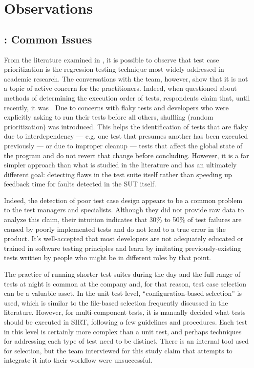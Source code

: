 \section{Observations}
\label{sec:ind_observations}

\subsection{: Common Issues}
\label{sec:ind_rq1}

From the literature examined in , it is possible to observe that test case prioritization is the regression testing technique most widely addressed in academic research.
The conversations with the team, however, show that it is not a topic of active concern for the practitioners.
Indeed, when questioned about methods of determining the execution order of tests, respondents claim that, until recently, it was .
Due to concerns with flaky tests and developers who were explicitly asking to run their tests before all others, shuffling (random prioritization) was introduced.
This helps the identification of tests that are flaky due to interdependency --- e.g. one test that presumes another has been executed previously --- or due to improper cleanup --- tests that affect the global state of the program and do not revert that change before concluding.
However, it is a far simpler approach than what is studied in the literature and has an ultimately different goal: detecting flaws in the test suite itself rather than speeding up feedback time for faults detected in the SUT itself.

Indeed, the detection of poor test case design appears to be a common problem to the test managers and specialists.
Although they did not provide raw data to analyze this claim, their intuition indicates that 30\% to 50\% of test failures are caused by poorly implemented tests and do not lead to a true error in the product.
It's well-accepted that most developers are not adequately educated or trained in software testing principles and learn by imitating previously-existing tests written by people who might be in different roles by that point.

The practice of running shorter test suites during the day and the full range of tests at night is common at the company and, for that reason, test case selection can be a valuable asset.
In the unit test level, ``configuration-based selection'' is used, which is similar to the file-based selection frequently discussed in the literature.
However, for multi-component tests, it is manually decided what tests should be executed in SIRT, following a few guidelines and procedures.
Each test in this level is certainly more complex than a unit test, and perhaps techniques for addressing each type of test need to be distinct.
There is an internal tool used for selection, but the team interviewed for this study claim that attempts to integrate it into their workflow were unsuccessful.

